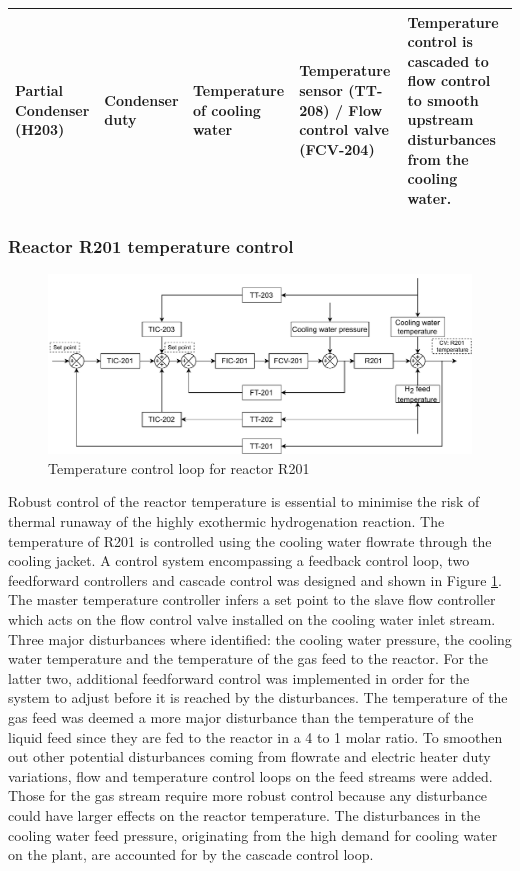 \begin{table}[h]
{\begin{tabular}{@{}p{3cm}|p{3cm}|p{4cm}|p{5cm}|p{6cm}@{}}
Partial Condenser (H203)                    & Condenser duty                              & Temperature of cooling water                            & Temperature sensor (TT-208) / Flow control valve (FCV-204)                 & Temperature control is cascaded to flow control to smooth upstream   disturbances from the cooling water.                            \\ \bottomrule
\end{tabular}}
\end{table}


\subsubsection{Reactor R201 temperature control} %
    \begin{figure}[h]
        \centering
        \includegraphics[width=\linewidth]{chapters/4-operation-control/4-Figures/R201-TC.pdf}
        \caption{Temperature control loop for reactor R201}
        \label{fig:R201-TC}
    \end{figure}
Robust control of the reactor temperature is essential to minimise the risk of thermal runaway of the highly exothermic hydrogenation reaction. The temperature of R201 is controlled using the cooling water flowrate through the cooling jacket. A control system encompassing a feedback control loop, two feedforward controllers and cascade control was designed and shown in Figure \ref{fig:R201-TC}. The master temperature controller infers a set point to the slave flow controller which acts on the flow control valve installed on the cooling water inlet stream. Three major disturbances where identified: the cooling water pressure, the cooling water temperature and the temperature of the gas feed to the reactor. For the latter two, additional feedforward control was implemented in order for the system to adjust before it is reached by the disturbances. The temperature of the gas feed was deemed a more major disturbance than the temperature of the liquid feed since they are fed to the reactor in a 4 to 1 molar ratio. To smoothen out other potential disturbances coming from flowrate and electric heater duty variations, flow and temperature control loops on the feed streams were added. Those for the gas stream require more robust control because any disturbance could have larger effects on the reactor temperature. The disturbances in the cooling water feed pressure, originating from the high demand for cooling water on the plant, are accounted for by the cascade control loop.

